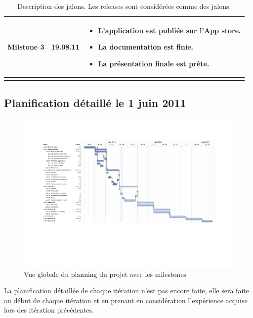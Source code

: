 \begin{longtable}{|c|l|p{10cm}|}
	 	\hline  Milstone 3 &  19.08.11 &
	  		 	\begin{itemize}
	  		 	 		\item L'application est publiée sur l'App store.
	  		 	 		\item La documentation est finie.
	  		 	 		\item La présentation finale est prête.
	  		 	\end{itemize}   \\  
		 \hline 
		\caption{\label{tab.DescMils}Description des jalons. Les releases sont considérées comme des jalons.} \label{grid_mlmmh} \\
	 \end{longtable} 

	 \begin{landscape}
	 	 \subsection{Planification détaillé le 1 juin 2011}
		 \begin{figure}[H]
			 \begin{center}	
				 \includegraphics[height=0.8\textwidth]{../comon/figures/planningV2.pdf}
				 \end{center}			
				 \caption{Vue globale du planning du projet avec les milestones}			
				 \label{planV1}			
		 \end{figure}	
	 \end{landscape}
	 La planification détaillée de chaque itération n'est pas encore faite, elle sera faite au début de chaque itération et en prenant en considération l'expérience acquise lors des itération précédentes. 
